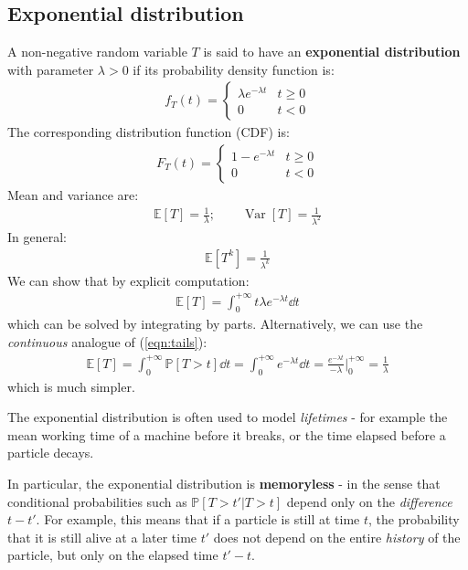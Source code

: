 \documentclass[../template.tex]{subfiles}
\begin{document}
\subsection{Exponential distribution}
A non-negative random variable $T$ is said to have an \textbf{exponential distribution} with parameter $\lambda > 0$ if its probability density function is:
\begin{align*}
    f_T (t) = \begin{cases}
        \lambda e^{- \lambda t} & t \geq 0\\
        0 & t < 0
    \end{cases}
\end{align*} 
The corresponding distribution function (CDF) is:
\begin{align*}
    F_T(t) = \begin{cases}
        1 - e^{-\lambda t} & t\geq 0\\
        0 & t < 0
    \end{cases}
\end{align*}
Mean and variance are:
\begin{align*}
    \mathbb{E}[T] = \frac{1}{\lambda}; \qquad \operatorname{Var}[T] = \frac{1}{\lambda^2}   
\end{align*}
In general:
\begin{align*}
    \mathbb{E}[T^k] = \frac{1}{\lambda^k} 
\end{align*}
We can show that by explicit computation:
\begin{align*}
    \mathbb{E}[T] = \int_0^{+\infty} t \lambda e^{-\lambda t} \dd{t} 
\end{align*}
which can be solved by integrating by parts. Alternatively, we can use the \textit{continuous} analogue of (\ref{eqn:tails}): 
\begin{align*}
    \mathbb{E}[T] = \int_0^{+\infty} \mathbb{P}[T > t] \dd{t} = \int_0^{+\infty} e^{- \lambda t} \dd{t} = \frac{e^{-\lambda t}}{-\lambda}\Big|_{0}^{+\infty} = \frac{1}{\lambda}  
\end{align*}
which is much simpler.

\medskip

The exponential distribution is often used to model \textit{lifetimes} - for example the mean working time of a machine before it breaks, or the time elapsed before a particle decays. 

In particular, the exponential distribution is \textbf{memoryless} - in the sense that conditional probabilities such as $\mathbb{P}[T > t'|T > t]$ depend only on the \textit{difference} $t-t'$. For example, this means that if a particle is still  at time $t$, the probability that it is still alive at a later time $t'$ does not depend on the entire \textit{history} of the particle, but only on the elapsed time $t'-t$.
\end{document}
